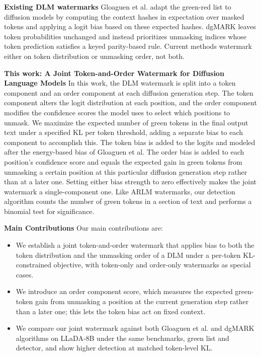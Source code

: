 \textbf{Existing DLM watermarks}
Gloaguen et al. \cite{gloaguen2025dlm} adapt the green-red list to diffusion models by computing the context hashes in expectation over masked tokens and applying a logit bias based on these expected hashes.
dgMARK \cite{hong2026dgmark} leaves token probabilities unchanged and instead prioritizes unmasking indices whose token prediction satisfies a keyed parity-based rule. Current methods watermark either on token distribution or unmasking order, not both.


\textbf{This work: A Joint Token-and-Order Watermark for Diffusion Language Models}
In this work, the DLM watermark is split into a token component and an order component at each diffusion generation step.
The token component alters the logit distribution at each position, and the order component modifies the confidence scores the model uses to
select which positions to unmask. We maximize the expected number of green tokens in the final output text under a specified KL per token
threshold, adding a separate bias to each component to accomplish this. The token bias is added to the logits and modeled after the energy-based bias of
Gloaguen et al. The order bias is added to each position's confidence score and equals the expected gain in green tokens
from unmasking a certain position at this particular diffusion generation step rather than at a later one. Setting either bias strength to zero effectively makes
the joint watermark a single-component one. Like ARLM watermarks, our detection algorithm counts the
number of green tokens in a section of text and performs a binomial test for significance.


\textbf{Main Contributions} Our main contributions are:
\begin{itemize}
   \item We establish a joint token-and-order watermark that applies bias to both the token distribution and the unmasking order of a DLM under a per-token KL-constrained objective, with token-only and order-only watermarks as special cases.
   \item We introduce an order component score, which measures the expected green-token gain from unmasking a position at the current generation step rather than a later one; this lets the token bias act on fixed context.
   \item We compare our joint watermark against both Gloaguen et al. and dgMARK algorithms on LLaDA-8B under the same benchmarks, green list and detector, and show higher detection at matched token-level KL.
\end{itemize}


